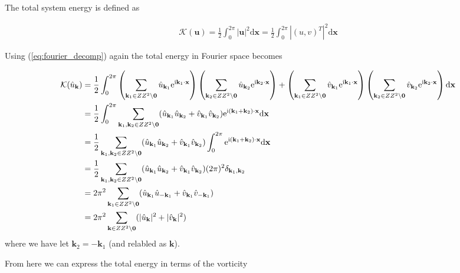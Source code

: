 \documentclass[9pt]{article}
\newcommand{\ii}{\mathrm{i}}      								  %
\newcommand{\e}{\mathrm{e}}      								  %
\newcommand{\bfu}{\mathbf{u}}											%
\newcommand{\bfx}{\mathbf{x}}								%
\newcommand{\bfk}{\mathbf{k}}								%
\newcommand{\bfkn}[1]{\mathbf{k}_{#1}}								%
\begin{document}
The total system energy is defined as

\begin{align}
	\mathcal{K}(\bfu) = \frac{1}{2}\int_0^{2 \pi}|\bfu|^2\mathrm{d}\bfx = \frac{1}{2}\int_0^{2\pi} |(u, v)^{T}|^2 \mathrm{d}\bfx 
\end{align}

Using (\ref{eq:fourier_decomp}) again the total energy in Fourier space becomes

\begin{align}
\mathcal{K}(\hat{u}_{\bfk})	&= \frac{1}{2}\int_0^{2\pi} \left(\sum_{\mathbf{k}_1\in \mathbb{Z}^2\setminus \mathbf{0}}\hat{u}_{\mathbf{k}_1}\e^{\ii \mathbf{k}_1\cdot \mathbf{x}}\right)\left(\sum_{\mathbf{k}_2\in \mathbb{Z}^2\setminus \mathbf{0}}\hat{u}_{\mathbf{k}_2}\e^{\ii \mathbf{k}_2\cdot \mathbf{x}}\right) + \left(\sum_{\mathbf{k}_1\in \mathbb{Z}^2\setminus \mathbf{0}}\hat{v}_{\mathbf{k}_1}\e^{\ii \mathbf{k}_1\cdot \mathbf{x}}\right)\left(\sum_{\mathbf{k}_2\in \mathbb{Z}^2\setminus \mathbf{0}}\hat{v}_{\mathbf{k}_2}\e^{\ii \mathbf{k}_2\cdot \mathbf{x}}\right) \mathrm{d}\bfx \notag\\
	&= \frac{1}{2}\int_0^{2\pi} \sum_{\mathbf{k}_1, \mathbf{k}_2\in \mathbb{Z}^2\setminus \mathbf{0}} (\hat{u}_{\mathbf{k}_1}\hat{u}_{\mathbf{k}_2} + \hat{v}_{\mathbf{k}_1}\hat{v}_{\mathbf{k}_2}) \e^{\ii (\mathbf{k}_1 + \mathbf{k}_2)\cdot \mathbf{x}} \mathrm{d}\bfx \notag \\
	&= \frac{1}{2}\sum_{\mathbf{k}_1, \mathbf{k}_2\in \mathbb{Z}^2\setminus \mathbf{0}} (\hat{u}_{\mathbf{k}_1}\hat{u}_{\mathbf{k}_2} + \hat{v}_{\mathbf{k}_1}\hat{v}_{\mathbf{k}_2}) \int_0^{2\pi} \e^{\ii (\mathbf{k}_1 + \mathbf{k}_2)\cdot \mathbf{x}} \mathrm{d}\bfx \notag \\
	&= \frac{1}{2}\sum_{\mathbf{k}_1, \mathbf{k}_2\in \mathbb{Z}^2\setminus \mathbf{0}} (\hat{u}_{\mathbf{k}_1}\hat{u}_{\mathbf{k}_2} + \hat{v}_{\mathbf{k}_1}\hat{v}_{\mathbf{k}_2}) (2\pi)^2 \delta_{\bfkn{1}, \bfkn{2}} \notag \\
	&= 2\pi^2 \sum_{\mathbf{k}_1\in \mathbb{Z}^2\setminus \mathbf{0}} (\hat{u}_{\mathbf{k}_1}\hat{u}_{-\mathbf{k}_1} + \hat{v}_{\mathbf{k}_1}\hat{v}_{-\mathbf{k}_{1}}) \notag \\
	&= 2\pi^2 \sum_{\mathbf{k}\in \mathbb{Z}^2\setminus \mathbf{0}} (|\hat{u}_{\mathbf{k}}|^2 + |\hat{v}_{\mathbf{k}}|^2)
	\label{eq:energy_u_fourier}
\end{align}
where we have let $\bfkn{2} = - \bfkn{1}$ (and relabled as $\bfk$).

From here we can express the total energy in terms of the vorticity 
\end{document}

